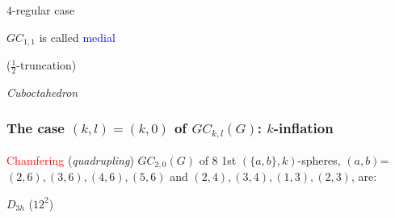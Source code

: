 \documentclass{beamer}
\begin{document}
\begin{frame}
\begin{center}
\begin{minipage}{4.6cm}
\vspace{0.6cm} 
$4$-regular case \par
$GC_{1,1}$ is called \textcolor{blue}{medial}\par
($\frac{1}{2}$-truncation)\par
{\em Cuboctahedron}
\end{minipage} 
\end{center} 

\end{frame}

\begin{frame}\frametitle{The case $(k,l)=(k,0)$ of $GC_{k,l}(G)$: $k$-inflation}
\vspace{-2.5mm}

 \textcolor{red}{Chamfering} ({\em quadrupling}) $GC_{2,0}(G)$  of $8$ 1st $(\{a,b\},k)$-spheres,  
 $(a,b)$=$(2,6),(3,6),(4,6),(5,6)$ and $(2,4),(3,4),(1,3),(2,3)$,  are: 
\begin{center}
\begin{minipage}[b]{18mm}
\centering
{}\par
$D_{3h}$  ($12^2$)
\end{minipage}
\begin{minipage}[b]{26mm}
\centering
{}\par

\end{minipage}
\end{center}
\end{frame}
\end{document}
